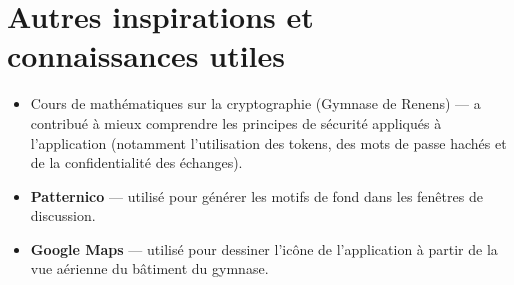 \documentclass[12pt]{report}
\begin{document}
\section{Autres inspirations et connaissances utiles}

\begin{itemize}
	\item Cours de mathématiques sur la cryptographie (Gymnase de Renens) — a contribué à mieux comprendre les principes de sécurité appliqués à l’application (notamment l’utilisation des tokens, des mots de passe hachés et de la confidentialité des échanges).
	\item \textbf{Patternico} — utilisé pour générer les motifs de fond dans les fenêtres de discussion.
	\item \textbf{Google Maps} — utilisé pour dessiner l’icône de l’application à partir de la vue aérienne du bâtiment du gymnase.
\end{itemize}
\end{document}
